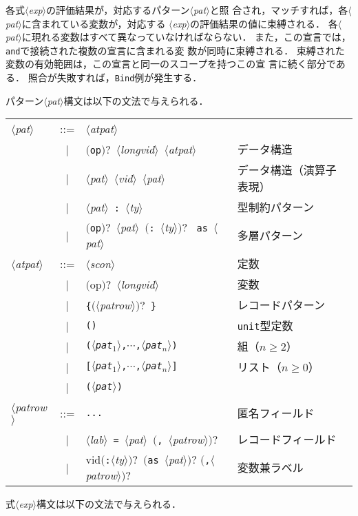\documentclass{jbook}
\newcommand{\code}[1]{\mbox{\large\tt #1}}
\newcommand{\vbar}{\mbox{\ $|$\ }}
\newcommand{\nonterm}[1]{\mbox{$\langle$}{\it #1}\mbox{$\rangle$}}
\newcommand{\term}[1]{\mbox{{\tt #1}}}
\newcommand{\optional}[1]{\mbox{$($}{\protect #1}\mbox{$)?$}}
\begin{document}
	各式\nonterm{exp}の評価結果が，対応するパターン\nonterm{pat}と照
合され，マッチすれば，各\nonterm{pat}に含まれている変数が，対応する
\nonterm{exp}の評価結果の値に束縛される．
	各\nonterm{pat}に現れる変数はすべて異なっていなければならない．
	また，この宣言では，\term{and}で接続された複数の宣言に含まれる変
数が同時に束縛される．
	束縛された変数の有効範囲は，この宣言と同一のスコープを持つこの宣
言に続く部分である．
	照合が失敗すれば，\code{Bind}例が発生する．

	パターン\nonterm{pat}構文は以下の文法で与えられる．

\begin{center}
\begin{tabular}{lcll}
\nonterm{pat} &::=& \nonterm{atpat} \\
&\vbar &\optional{\term{op}}\ \nonterm{longvid}\ \nonterm{atpat}& データ構造\\
&\vbar &\nonterm{pat}\ \nonterm{vid}\ \nonterm{pat} & データ構造（演算子表現）\\
&\vbar &\nonterm{pat}\ \term{:}\ \nonterm{ty} & 型制約パターン\\
&\vbar &\optional{\term{op}}\ \nonterm{pat}\ \optional{\term{:}\ \nonterm{ty}} {\tt
as}\ \nonterm{pat} & 多層パターン\\
\nonterm{atpat} &::=&\nonterm{scon} & 定数\\
&\vbar&\optional{op}\ \nonterm{longvid} & 変数\\
&\vbar&\term{\{}\optional{\nonterm{patrow}}\ \term{\}}& レコードパターン\\
&\vbar&\term{()}& \term{unit}型定数\\
&\vbar&\term{(\nonterm{pat$_1$},$\cdots$,\nonterm{pat$_n$})}& 組（$n\ge 2$）\\
&\vbar&\term{[\nonterm{pat$_1$},$\cdots$,\nonterm{pat$_n$}]}& リスト（$n\ge 0$）\\
&\vbar&\term{(\nonterm{pat})}& \\
\nonterm{patrow}&::=& \verb|...| & 匿名フィールド\\
&\vbar&\nonterm{lab}\ \term{=}\ \nonterm{pat}\ \optional{\term{,}\ \nonterm{patrow}} & レコードフィールド\\
&\vbar&vid\optional{\term{:}\nonterm{ty}}\ \optional{\term{as}\ \nonterm{pat}}
\optional{\term{,}\nonterm{patrow}} & 変数兼ラベル\\
\end{tabular}
\end{center}

式\nonterm{exp}構文は以下の文法で与えられる．
\end{document}

